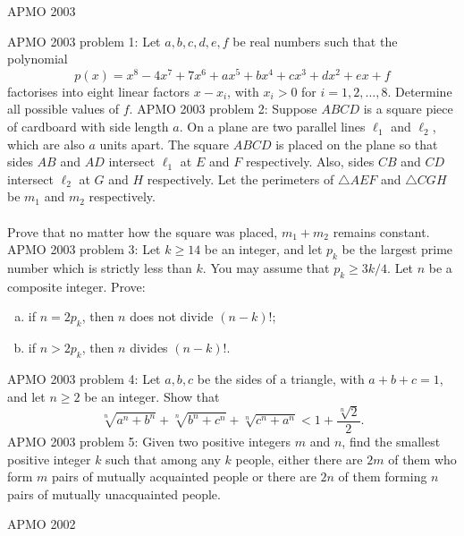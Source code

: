 APMO 2003 

APMO 2003 problem 1:  Let $a,b,c,d,e,f$ be real numbers such that the polynomial
\[ p(x)=x^8-4x^7+7x^6+ax^5+bx^4+cx^3+dx^2+ex+f \]
factorises into eight linear factors $x-x_i$, with $x_i>0$ for $i=1,2,\ldots,8$. Determine all possible values of $f$. 
APMO 2003 problem 2:  Suppose $ABCD$ is a square piece of cardboard with side length $a$. On a plane are two parallel lines $\ell_1$ and $\ell_2$, which are also $a$ units apart. The square $ABCD$ is placed on the plane so that sides $AB$ and $AD$ intersect $\ell_1$ at $E$ and $F$ respectively. Also, sides $CB$ and $CD$ intersect $\ell_2$ at $G$ and $H$ respectively. Let the perimeters of $\triangle AEF$ and $\triangle CGH$ be $m_1$ and $m_2$ respectively. \\\\
Prove that no matter how the square was placed, $m_1+m_2$ remains constant. 
APMO 2003 problem 3:  Let $k\ge 14$ be an integer, and let $p_k$ be the largest prime number which is strictly less than $k$. You may assume that $p_k\ge 3k/4$. Let $n$ be a composite integer. Prove:
\begin{enumerate}[(a)]
  \item if $n=2p_k$, then $n$ does not divide $(n-k)!$;
  \item if $n>2p_k$, then $n$ divides $(n-k)!$.
\end{enumerate} 
APMO 2003 problem 4:  Let $a,b,c$ be the sides of a triangle, with $a+b+c=1$, and let $n\ge 2$ be an integer. Show that
\[ \sqrt[n]{a^n+b^n}+\sqrt[n]{b^n+c^n}+\sqrt[n]{c^n+a^n}<1+\frac{\sqrt[n]{2}}{2}. \] 
APMO 2003 problem 5:  Given two positive integers $m$ and $n$, find the smallest positive integer $k$ such that among any $k$ people, either there are $2m$ of them who form $m$ pairs of mutually acquainted people or there are $2n$ of them forming $n$ pairs of mutually unacquainted people. 

APMO 2002 

